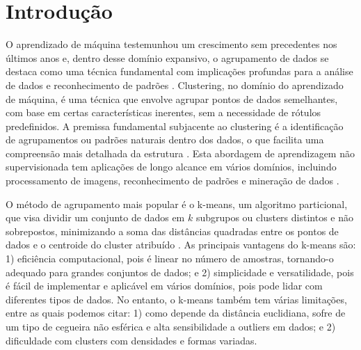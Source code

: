 \documentclass[sn-mathphys,Numbered]{sn-jnl}%
\theoremstyle{thmstyleone}%
\theoremstyle{thmstyletwo}%
\theoremstyle{thmstylethree}%
\begin{document}
\section{Introdução}\label{sec1}

O aprendizado de máquina testemunhou um crescimento sem precedentes nos últimos anos e, dentro desse domínio expansivo, o agrupamento de dados se destaca como uma técnica fundamental com implicações profundas para a análise de dados e reconhecimento de padrões \cite{Clustering1,Clustering2,Clustering3}. Clustering, no domínio do aprendizado de máquina, é uma técnica que envolve agrupar pontos de dados semelhantes, com base em certas características inerentes, sem a necessidade de rótulos predefinidos. A premissa fundamental subjacente ao clustering é a identificação de agrupamentos ou padrões naturais dentro dos dados, o que facilita uma compreensão mais detalhada da estrutura \cite{Clustering4}. Esta abordagem de aprendizagem não supervisionada tem aplicações de longo alcance em vários domínios, incluindo processamento de imagens, reconhecimento de padrões e mineração de dados \cite{Clustering5}.

O método de agrupamento mais popular é o k-means, um algoritmo particional, que visa dividir um conjunto de dados em $k$ subgrupos ou clusters distintos e não sobrepostos, minimizando a soma das distâncias quadradas entre os pontos de dados e o centroide do cluster atribuído \cite{kmeans1,kmeans2}. As principais vantagens do k-means são: 1) eficiência computacional, pois é linear no número de amostras, tornando-o adequado para grandes conjuntos de dados; e 2) simplicidade e versatilidade, pois é fácil de implementar e aplicável em vários domínios, pois pode lidar com diferentes tipos de dados. No entanto, o k-means também tem várias limitações, entre as quais podemos citar: 1) como depende da distância euclidiana, sofre de um tipo de cegueira não esférica e alta sensibilidade a outliers em dados; e 2) dificuldade com clusters com densidades e formas variadas.
\end{document}
